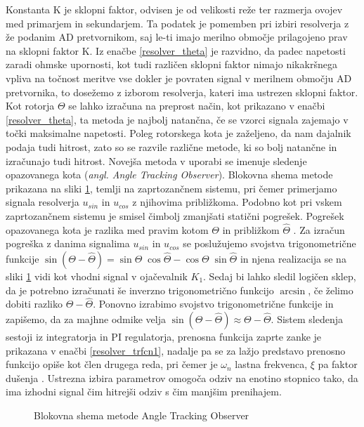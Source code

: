 \documentclass[a4paper,twoside,openright,12pt]{book}
\begin{document}
Konstanta K je sklopni faktor, odvisen je od velikosti reže ter razmerja ovojev med primarjem in sekundarjem. Ta podatek je pomemben pri izbiri resolverja z že podanim AD pretvornikom, saj le-ti imajo merilno območje prilagojeno prav na sklopni faktor K. Iz enačbe \ref{resolver_theta} je razvidno, da padec napetosti zaradi ohmske upornosti, kot tudi različen sklopni faktor nimajo nikakršnega vpliva na točnost meritve vse dokler je povraten signal v merilnem območju AD pretvornika, to dosežemo z izborom resolverja, kateri ima ustrezen sklopni faktor.\\
Kot rotorja $\Theta$ se lahko izračuna na preprost način, kot prikazano v enačbi \ref{resolver_theta}, ta metoda je najbolj natančna, če se vzorci signala zajemajo v točki maksimalne napetosti. Poleg rotorskega kota je zaželjeno, da nam dajalnik podaja tudi hitrost, zato so se razvile različne metode, ki so bolj natančne in izračunajo tudi hitrost. Novejša metoda v uporabi se imenuje sledenje opazovanega kota (\textit{angl. Angle Tracking Observer}). Blokovna shema metode prikazana na sliki \ref{resolver1}, temlji na zaprtozančnem sistemu, pri čemer primerjamo signala resolverja $u_{sin}$ in   $u_{cos}$ z njihovima približkoma. Podobno kot pri vskem zaprtozančnem sistemu je smisel čimbolj zmanjšati statični pogrešek. Pogrešek opazovanega kota je razlika med pravim kotom $\Theta$ in  približkom $\hat{\Theta}$ \cite{Reddy-ATO}. Za izračun pogreška z danima signalima  $u_{sin}$ in   $u_{cos}$ se poslužujemo svojstva trigonometrične funkcije $\sin(\Theta - \hat{\Theta}) =  \sin\Theta\;\cos\hat{\Theta} -  \cos\Theta\;\sin\hat{\Theta}$ in njena realizacija se na sliki \ref{resolver1} vidi kot vhodni signal v ojačevalnik $K_1$. Sedaj  bi lahko sledil logičen sklep, da je potrebno izračunati še inverzno trigonometrično funkcijo $\arcsin$, če želimo dobiti razliko $\Theta - \hat{\Theta}$. Ponovno izrabimo svojstvo trigonometrične funkcije in zapišemo, da za majhne odmike velja  $\sin(\Theta - \hat{\Theta}) \approx \Theta - \hat{\Theta} $. Sistem sledenja sestoji iz integratorja in PI regulatorja, prenosna funkcija zaprte zanke je prikazana v enačbi \ref{resolver_trfcn1}, nadalje pa se za lažjo predstavo prenosno funkcijo opiše kot člen drugega reda, pri čemer je $\omega_{n}$ lastna frekvenca, $\xi$ pa faktor dušenja \cite{semiconductor2009using}. Ustrezna izbira parametrov omogoča odziv na enotino stopnico tako, da ima izhodni signal čim hitrejši odziv s čim manjšim prenihajem.
\begin{figure}[h]
	\centering

	 \def\svgwidth{\columnwidth}
	 
	 \caption{\label{resolver1} Blokovna shema metode Angle Tracking Observer}
\end{figure}
\end{document}
